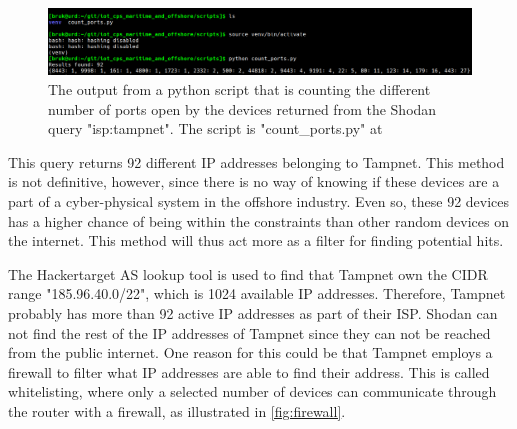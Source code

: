 \begin{figure} [H]
    \centering
    \includegraphics[scale=0.35]{Figurer/python_ports.png}
    \caption{The output from a python script that is counting the different number of ports open by the devices returned from the Shodan query "isp:tampnet". The script is "count\_ports.py" at \cite{scripts}}
    \label{fig:tampnet_ports}
\end{figure}

This query returns 92 different IP addresses belonging to Tampnet. This method is not definitive, however, since there is no way of knowing if these devices are a part of a cyber-physical system in the offshore industry. Even so, these 92 devices has a higher chance of being within the constraints than other random devices on the internet. This method will thus act more as a filter for finding potential hits. 

The Hackertarget AS lookup tool \cite{asip_lookup} is used to find that Tampnet own the CIDR range "185.96.40.0/22", which is 1024 available IP addresses. \cite{CIDR_table} Therefore, Tampnet probably has more than 92 active IP addresses as part of their ISP. Shodan can not find the rest of the IP addresses of Tampnet since they can not be reached from the public internet. One reason for this could be that Tampnet employs a firewall to filter what IP addresses are able to find their address. This is called whitelisting, where only a selected number of devices can communicate through the router with a firewall, as illustrated in \cref{fig:firewall}.


